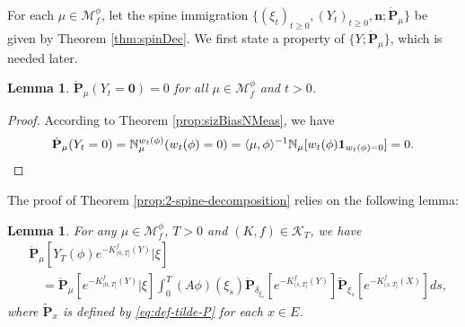 \documentclass[UTF8]{pkuthss}
\theoremstyle{plain}
\newtheorem{lem}[thm]{Lemma}
\theoremstyle{definition}
\numberwithin{equation}{section}
\begin{document}
 For each $\mu \in \mathcal M_f^\phi$, let the spine immigration $\{(\xi_t)_{t\geq 0}, (Y_t)_{t\geq 0}, \mathbf n; \dot {\mathbf P}_\mu\}$ be given by Theorem \ref{thm:spinDec}.
	We first state a property of $\{Y; \dot{\mathbf P}_\mu\}$, which is needed later.
\begin{lem}\label{lem:Y-is-immortal}
	$\dot{\mathbf P}_\mu(Y_t = \mathbf 0) = 0$ for all $\mu \in \mathcal M_f^\phi$ and $t>0$.
\end{lem}
\begin{proof}
	According to Theorem \ref{prop:sizBiasNMeas}, we have
\[
	\dot{\mathbf P}_\mu (Y_t = 0)
	= \mathbb N^{w_t(\phi)}_\mu ( w_t(\phi) = 0 )
	= \langle \mu, \phi \rangle^{-1} \mathbb N_\mu [ w_t(\phi) \mathbf 1_{w_t(\phi) = 0}]
	= 0. \qedhere
\]
\end{proof}
\par
	The proof of Theorem \ref{prop:2-spine-decomposition} relies on the following lemma:
\begin{lem}
\label{lem:key-lemma}
	For any $\mu\in \mathcal M_f^\phi$, $T>0$ and $(K,f)\in \mathcal K_T$, we have
\[\begin{split}
    &\dot{\mathbf P}_\mu [Y_T(\phi) e^{-K_{(0, T]}^f(Y)}|\xi]\\
    &\quad =\dot{\mathbf P}_\mu[e^{-K_{(0, T]}^f(Y)}|\xi]\int_0^T  (A\phi)(\xi_s)\dot{\mathbf P}_{\delta_{\xi_s}}[e^{-K_{(s, T]}^f(Y)}]\widetilde {\mathbf P}_{\xi_s}[e^{-K^f_{(s, T]}(X)}]ds,
\end{split}\]
where $\widetilde {\mathbf P}_{x}$ is defined by \eqref{eq:def-tilde-P} for each $x\in E$.
\end{lem}
\end{document}

